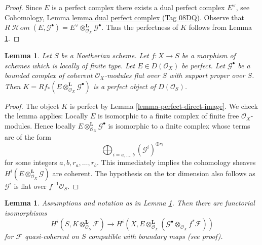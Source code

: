 \documentclass{amsart}
\theoremstyle{plain}
\newtheorem{lemma}[subsection]{Lemma}
\theoremstyle{definition}
\theoremstyle{remark}
\numberwithin{equation}{subsection}
\def\SheafHom{\mathop{\mathcal{H}\!\mathit{om}}\nolimits}
\begin{document}
\begin{proof}
Since $E$ is a perfect complex there exists a dual perfect complex
$E^\vee$, see Cohomology, Lemma \href{https://stacks.math.columbia.edu/tag/08DQ}{lemma dual perfect complex (Tag 08DQ)}.
Observe that $R\SheafHom(E, \mathcal{G}^\bullet) =
E^\vee \otimes^\mathbf{L}_{\mathcal{O}_X} \mathcal{G}^\bullet$.
Thus the perfectness of $K$ follows from Lemma \ref{lemma-tensor-perfect}.
\end{proof}


\begin{lemma}
\label{lemma-tensor-perfect}
Let $S$ be a Noetherian scheme. Let $f : X \to S$ be a morphism of schemes
which is locally of finite type. Let $E \in D(\mathcal{O}_X)$ be perfect.
Let $\mathcal{G}^\bullet$ be a bounded complex of coherent
$\mathcal{O}_X$-modules flat over $S$ with support proper over $S$.
Then $K = Rf_*(E \otimes_{\mathcal{O}_X}^\mathbf{L} \mathcal{G}^\bullet)$
is a perfect object of $D(\mathcal{O}_S)$.
\end{lemma}

\begin{proof}
The object $K$ is perfect by Lemma \ref{lemma-perfect-direct-image}.
We check the lemma applies: Locally $E$ is isomorphic to a finite complex
of finite free $\mathcal{O}_X$-modules. Hence locally
$E \otimes^\mathbf{L}_{\mathcal{O}_X} \mathcal{G}^\bullet$ is isomorphic
to a finite complex whose terms are of the form
$$
\bigoplus\nolimits_{i = a, \ldots, b} (\mathcal{G}^i)^{\oplus r_i}
$$
for some integers $a, b, r_a, \ldots, r_b$. This immediately implies the
cohomology sheaves $H^i(E \otimes^\mathbf{L}_{\mathcal{O}_X} \mathcal{G})$
are coherent. The hypothesis on the tor dimension also follows as
$\mathcal{G}^i$ is flat over $f^{-1}\mathcal{O}_S$.
\end{proof}


\begin{lemma}
\label{lemma-compute-tensor-perfect}
Assumptions and notation as in Lemma \ref{lemma-tensor-perfect}.
Then there are functorial isomorphisms
$$
H^i(S, K \otimes^\mathbf{L}_{\mathcal{O}_S} \mathcal{F})
\longrightarrow
H^i(X, E \otimes_{\mathcal{O}_X}^\mathbf{L}
(\mathcal{G}^\bullet \otimes_{\mathcal{O}_X} f^*\mathcal{F}))
$$
for $\mathcal{F}$ quasi-coherent on $S$
compatible with boundary maps (see proof).
\end{lemma}
\end{document}
